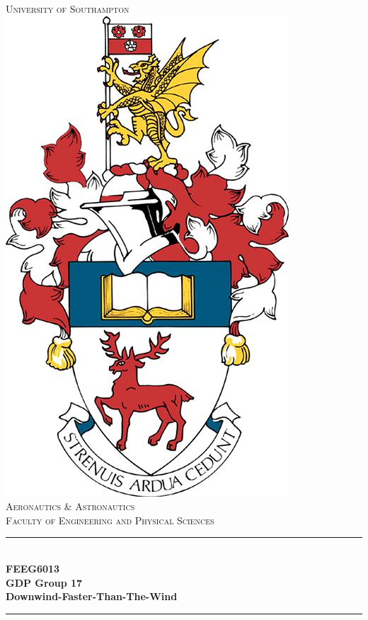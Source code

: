 \begin{center}

\newcommand{\HRule}{\rule{\linewidth}{0.5mm}} %

\center %

\textsc{\LARGE University of Southampton}\\[7mm] %
\includegraphics[scale=.17]{images/crest.jpg}\\[0.5cm] %
\textsc{\Large Aeronautics \& Astronautics}\\[0.15cm] %
\textsc{\large Faculty of Engineering and Physical Sciences}\\[0.2cm] %

\HRule \\[4mm]
{ \huge \bfseries FEEG6013}\\[0.4cm]
{ \huge \bfseries GDP Group 17}\\[0.4cm]
{ \huge \bfseries Downwind-Faster-Than-The-Wind}\\[0.4cm]
\HRule \\[6mm]


\end{center}
